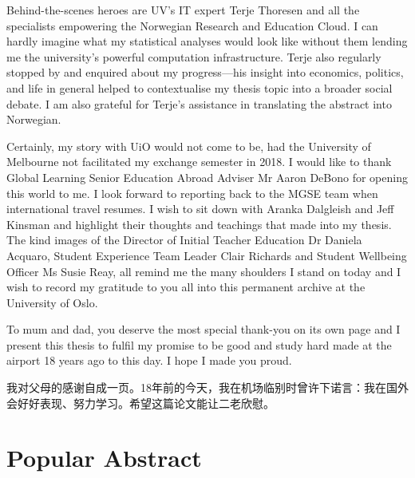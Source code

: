 \documentclass[a4paper,11pt,UKenglish,twoside,openright]{report}\usepackage[]{graphicx}\usepackage[]{color}
\begin{document}
Behind-the-scenes heroes are UV's IT expert Terje Thoresen and all the specialists empowering the Norwegian Research and Education Cloud. I can hardly imagine what my statistical analyses would look like without them lending me the university's powerful computation infrastructure. Terje also regularly stopped by and enquired about my progress---his insight into economics, politics, and life in general helped to contextualise my thesis topic into a broader social debate. I am also grateful for Terje's assistance in translating the abstract into Norwegian.

Certainly, my story with UiO would not come to be, had the University of Melbourne not facilitated my exchange semester in 2018. I would like to thank Global Learning Senior Education Abroad Adviser Mr Aaron DeBono for opening this world to me. I look forward to reporting back to the MGSE team when international travel resumes. I wish to sit down with Aranka Dalgleish and Jeff Kinsman and highlight their thoughts and teachings that made into my thesis. The kind images of the Director of Initial Teacher Education Dr Daniela Acquaro, Student Experience Team Leader Clair Richards and Student Wellbeing Officer Ms Susie Reay, all remind me the many shoulders I stand on today and I wish to record my gratitude to you all into this permanent archive at the University of Oslo.

To mum and dad, you deserve the most special thank-you on its own page and I present this thesis to fulfil my promise to be good and study hard made at the airport 18 years ago to this day. I hope I made you proud.

我对父母的感谢自成一页。18年前的今天，我在机场临别时曾许下诺言：我在国外会好好表现、努力学习。希望这篇论文能让二老欣慰。


\chapter*{Popular Abstract}
\label{Ab.0}
\end{document}
